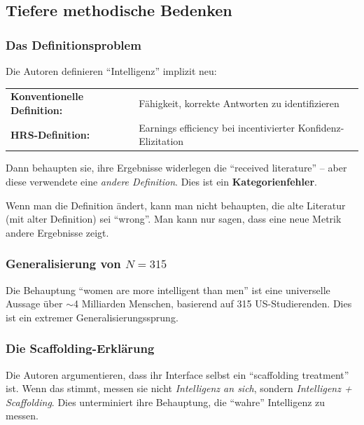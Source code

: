 \subsection{Tiefere methodische Bedenken}

\subsubsection{Das Definitionsproblem}

Die Autoren definieren ``Intelligenz'' implizit neu:

\begin{table}[H]
\centering
\begin{tabular}{ll}
\toprule
\textbf{Konventionelle Definition:} & F\"ahigkeit, korrekte Antworten zu identifizieren \\
\textbf{HRS-Definition:} & Earnings efficiency bei incentivierter Konfidenz-Elizitation \\
\bottomrule
\end{tabular}
\end{table}

Dann behaupten sie, ihre Ergebnisse widerlegen die ``received literature'' -- aber diese verwendete eine \emph{andere Definition}. Dies ist ein \textbf{Kategorienfehler}.

\begin{principlebox}
Wenn man die Definition \"andert, kann man nicht behaupten, die alte Literatur (mit alter Definition) sei ``wrong''. Man kann nur sagen, dass eine neue Metrik andere Ergebnisse zeigt.
\end{principlebox}


\subsubsection{Generalisierung von $N = 315$}

Die Behauptung ``women are more intelligent than men'' ist eine universelle Aussage \"uber $\sim$4 Milliarden Menschen, basierend auf 315 US-Studierenden. Dies ist ein extremer Generalisierungssprung.


\subsubsection{Die Scaffolding-Erkl\"arung}

Die Autoren argumentieren, dass ihr Interface selbst ein ``scaffolding treatment'' ist. Wenn das stimmt, messen sie nicht \emph{Intelligenz an sich}, sondern \emph{Intelligenz + Scaffolding}. Dies unterminiert ihre Behauptung, die ``wahre'' Intelligenz zu messen.



